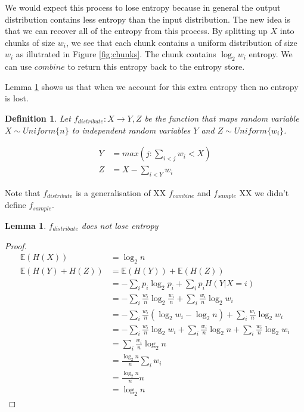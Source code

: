 \documentclass[12pt]{article}
\newtheorem{lemma}{Lemma}
\newtheorem{definition}{Definition}
\begin{document}
We would expect this process to lose entropy because in general the output distribution contains less entropy than the input distribution. The new idea is that we can recover all of the entropy from this process. By splitting up $X$ into chunks of size $w_i$, we see that each chunk contains a uniform distribution of size $w_i$ as illutrated in Figure \ref{fig:chunks}. The chunk contains $\log_2w_i$ entropy. We can use $combine$ to return this entropy back to the entropy store.

Lemma \ref{lem:distribution-conservation} shows us that when we account for this extra entropy then no entropy is lost.

\begin{definition}
    Let $f_{distribute}: X \rightarrow Y, Z$ be the function that maps random variable $X \sim Uniform\{n\}$ to independent random variables $Y$ and $Z \sim Uniform\{w_i\}$.

    \begin{align}
    Y &= max(j : \sum_{i<j}w_i<X) \\
    Z &= X - \sum_{i<Y}w_i
    \end{align}

\end{definition}

Note that $f_{distribute}$ is a generalisation of XX $f_{combine}$ and $f_{sample}$ XX we didn't define $f_{sample}$.

\begin{lemma}
    \label{lem:distribution-conservation}
    $f_{distribute}$ does not lose entropy
\end{lemma}

\begin{proof}
    \begin{align}
    \mathbb{E}(H(X)) & = \log_2 n \\
    \mathbb{E}(H(Y) + H(Z)) &=  \mathbb{E}(H(Y)) + \mathbb{E}(H(Z)) \\
               & = - \sum_i p_i \log_2p_i + \sum_i p_iH(Y|X=i) \\
               & = - \sum_i \frac{w_i}{n} \log_2 \frac{w_i}{n} + \sum_i \frac{w_i}{n}\log_2 w_i \\
               & = - \sum_i \frac{w_i}{n}(\log_2 w_i - \log_2 n) + \sum_i \frac{w_i}{n}\log_2 w_i \\
               & = - \sum_i \frac{w_i}{n}\log_2 w_i + \sum_i \frac{w_i}{n} \log_2 n + \sum_i \frac{w_i}{n}\log_2 w_i \\
               & = \sum_i \frac{w_i}{n} \log_2 n \\
               & = \frac{\log_2 n}{n} \sum_i w_i \\
               & = \frac{\log_2 n}{n} n \\
               & = \log_2 n
    \end{align}
\end{proof}
\end{document}
